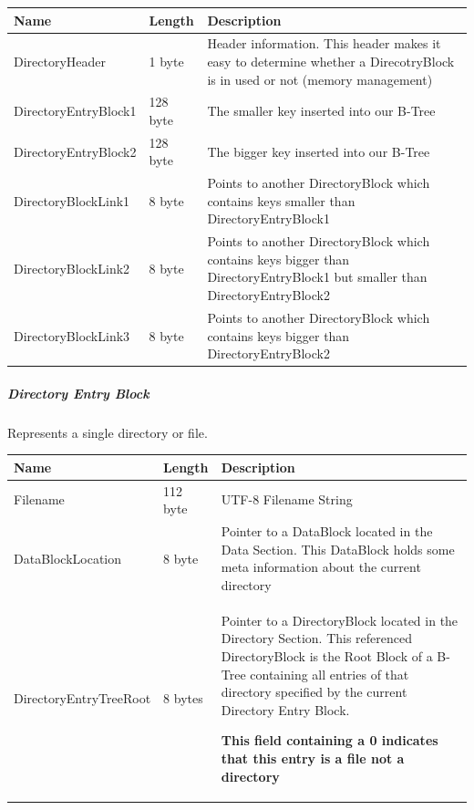 \begin{tabular}{|l|l|p{5cm}|}
\hline
  \textbf{Name} & \textbf{Length} & \textbf{Description}
\\  \hline

DirectoryHeader & 1 byte & Header information. This header makes it easy to determine whether a DirecotryBlock is in used or not (memory management)

\\  \hline

DirectoryEntryBlock1 & 128 byte & The smaller key inserted into our B-Tree

\\  \hline

DirectoryEntryBlock2 & 128 byte & The bigger key inserted into our B-Tree

\\  \hline

DirectoryBlockLink1 & 8 byte & Points to another DirectoryBlock which contains keys smaller than DirectoryEntryBlock1

\\  \hline

DirectoryBlockLink2 & 8 byte & Points to another DirectoryBlock which contains keys bigger than DirectoryEntryBlock1 but smaller than DirectoryEntryBlock2

\\  \hline

DirectoryBlockLink3 & 8 byte & Points to another DirectoryBlock which contains keys bigger than DirectoryEntryBlock2

\\  \hline


\end{tabular}

\subparagraph*{Directory Entry Block}

Represents a single directory or file.

\begin{tabular}{|l|l|p{5cm}|}
\hline
  \textbf{Name} & \textbf{Length} & \textbf{Description}
\\  \hline

Filename & 112 byte & UTF-8 Filename String 


\\  \hline

DataBlockLocation & 8 byte & Pointer to a DataBlock located in the Data Section.
This DataBlock holds some meta information about the current directory


\\  \hline

DirectoryEntryTreeRoot & 8 bytes & Pointer to a DirectoryBlock located in the
Directory Section. This referenced DirectoryBlock is the Root Block of a B-Tree
containing all entries of that directory specified by the current Directory Entry Block.
\newline

\textbf{This field containing a 0 indicates that this entry is a file not a directory}



\\  \hline

\end{tabular}


